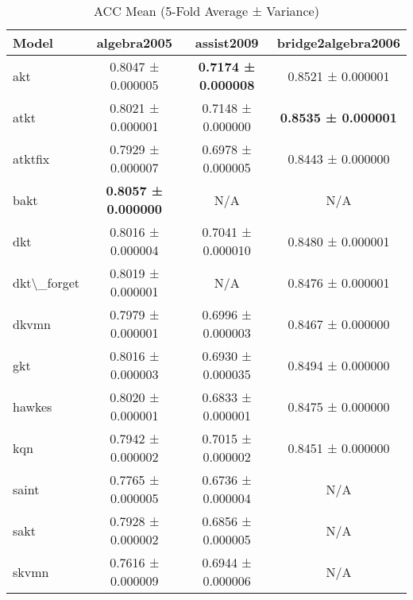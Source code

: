 \begin{table}[H]
\centering
\caption{ACC Mean (5-Fold Average ± Variance)}
\label{tab:acc_mean}
\begin{tabular}{lccc}
\toprule
Model & algebra2005 & assist2009 & bridge2algebra2006 \\
\midrule
akt & 0.8047 ± 0.000005 & \textbf{0.7174 ± 0.000008} & 0.8521 ± 0.000001 \\
atkt & 0.8021 ± 0.000001 & 0.7148 ± 0.000000 & \textbf{0.8535 ± 0.000001} \\
atktfix & 0.7929 ± 0.000007 & 0.6978 ± 0.000005 & 0.8443 ± 0.000000 \\
bakt & \textbf{0.8057 ± 0.000000} & N/A & N/A \\
dkt & 0.8016 ± 0.000004 & 0.7041 ± 0.000010 & 0.8480 ± 0.000001 \\
dkt\textbackslash{}_forget & 0.8019 ± 0.000001 & N/A & 0.8476 ± 0.000001 \\
dkvmn & 0.7979 ± 0.000001 & 0.6996 ± 0.000003 & 0.8467 ± 0.000000 \\
gkt & 0.8016 ± 0.000003 & 0.6930 ± 0.000035 & 0.8494 ± 0.000000 \\
hawkes & 0.8020 ± 0.000001 & 0.6833 ± 0.000001 & 0.8475 ± 0.000000 \\
kqn & 0.7942 ± 0.000002 & 0.7015 ± 0.000002 & 0.8451 ± 0.000000 \\
saint & 0.7765 ± 0.000005 & 0.6736 ± 0.000004 & N/A \\
sakt & 0.7928 ± 0.000002 & 0.6856 ± 0.000005 & N/A \\
skvmn & 0.7616 ± 0.000009 & 0.6944 ± 0.000006 & N/A \\
\bottomrule
\end{tabular}
\end{table}